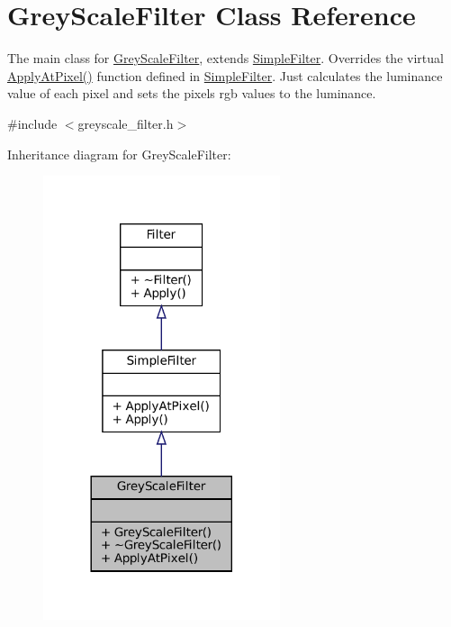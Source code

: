 \hypertarget{classGreyScaleFilter}{}\section{Grey\+Scale\+Filter Class Reference}
\label{classGreyScaleFilter}


The main class for \hyperlink{classGreyScaleFilter}{Grey\+Scale\+Filter}, extends \hyperlink{classSimpleFilter}{Simple\+Filter}. Overrides the virtual \hyperlink{classGreyScaleFilter_ac781a1ddd205f2d67d1c08481d5ab2e4}{Apply\+At\+Pixel()} function defined in \hyperlink{classSimpleFilter}{Simple\+Filter}. Just calculates the luminance value of each pixel and sets the pixels rgb values to the luminance.  




{\ttfamily \#include $<$greyscale\+\_\+filter.\+h$>$}



Inheritance diagram for Grey\+Scale\+Filter\+:\nopagebreak
\begin{figure}[H]
\begin{center}
\leavevmode
\includegraphics[width=197pt]{classGreyScaleFilter__inherit__graph}
\end{center}
\end{figure}


